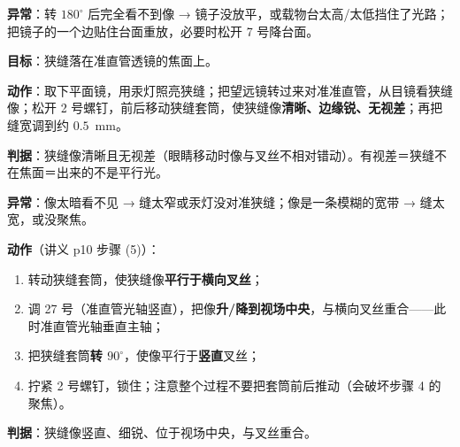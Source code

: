 \documentclass[11pt]{ctexart}
\begin{document}

\textbf{异常}：转 $180^{\circ}$ 后完全看不到像 → 镜子没放平，或载物台太高/太低挡住了光路；把镜子的一个边贴住台面重放，必要时松开 7 号降台面。


\textbf{目标}：狭缝落在准直管透镜的焦面上。

\textbf{动作}：取下平面镜，用汞灯照亮狭缝；把望远镜转过来对准准直管，从目镜看狭缝像；松开 2 号螺钉，前后移动狭缝套筒，使狭缝像\textbf{清晰、边缘锐、无视差}；再把缝宽调到约 $0.5$~mm。

\textbf{判据}：狭缝像清晰且无视差（眼睛移动时像与叉丝不相对错动）。有视差＝狭缝不在焦面＝出来的不是平行光。

\textbf{异常}：像太暗看不见 → 缝太窄或汞灯没对准狭缝；像是一条模糊的宽带 → 缝太宽，或没聚焦。


\textbf{动作}（讲义 p10 步骤 (5)）：

\begin{enumerate}[label=(\arabic*)]
\item 转动狭缝套筒，使狭缝像\textbf{平行于横向叉丝}；
\item 调 27 号（准直管光轴竖直），把像\textbf{升/降到视场中央}，与横向叉丝重合——此时准直管光轴垂直主轴；
\item 把狭缝套筒\textbf{转 $90^{\circ}$}，使像平行于\textbf{竖直}叉丝；
\item 拧紧 2 号螺钉，锁住；注意整个过程不要把套筒前后推动（会破坏步骤 4 的聚焦）。
\end{enumerate}

\textbf{判据}：狭缝像竖直、细锐、位于视场中央，与叉丝重合。

\end{document}
